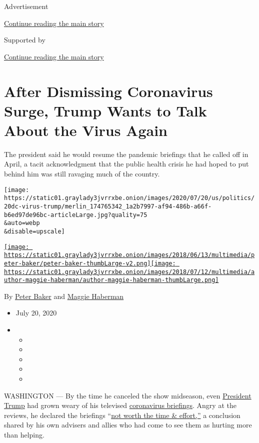 Advertisement

\protect\hyperlink{after-top}{Continue reading the main story}

Supported by

\protect\hyperlink{after-sponsor}{Continue reading the main story}

\hypertarget{after-dismissing-coronavirus-surge-trump-wants-to-talk-about-the-virus-again}{%
\section{After Dismissing Coronavirus Surge, Trump Wants to Talk About
the Virus
Again}\label{after-dismissing-coronavirus-surge-trump-wants-to-talk-about-the-virus-again}}

The president said he would resume the pandemic briefings that he called
off in April, a tacit acknowledgment that the public health crisis he
had hoped to put behind him was still ravaging much of the country.

\texttt{[image: https://static01.graylady3jvrrxbe.onion/images/2020/07/20/us/politics/20dc-virus-trump/merlin\_174765342\_1a2b7997-af94-486b-a66f-b6ed97de96bc-articleLarge.jpg?quality=75\\\&auto=webp\\\&disable=upscale]}

\href{https://www.nytimes3xbfgragh.onion/by/peter-baker}{\texttt{[image: https://static01.graylady3jvrrxbe.onion/images/2018/06/13/multimedia/peter-baker/peter-baker-thumbLarge-v2.png]}}\href{https://www.nytimes3xbfgragh.onion/by/maggie-haberman}{\texttt{[image: https://static01.graylady3jvrrxbe.onion/images/2018/07/12/multimedia/author-maggie-haberman/author-maggie-haberman-thumbLarge.png]}}

By \href{https://www.nytimes3xbfgragh.onion/by/peter-baker}{Peter Baker}
and \href{https://www.nytimes3xbfgragh.onion/by/maggie-haberman}{Maggie
Haberman}

\begin{itemize}
\item
  July 20, 2020
\item
  \begin{itemize}
  \item
  \item
  \item
  \item
  \item
  \end{itemize}
\end{itemize}

WASHINGTON --- By the time he canceled the show midseason, even
\href{https://www.nytimes3xbfgragh.onion/2020/07/25/us/politics/trump-florida-convention.html}{President
Trump} had grown weary of his televised
\href{https://www.nytimes3xbfgragh.onion/2020/07/21/arts/television/trump-briefings.html}{coronavirus
briefings}. Angry at the reviews, he declared the briefings
``\href{https://twitter.com/realDonaldTrump/status/1254168730898173953}{not
worth the time \& effort,''} a conclusion shared by his own advisers and
allies who had come to see them as hurting more than helping.

